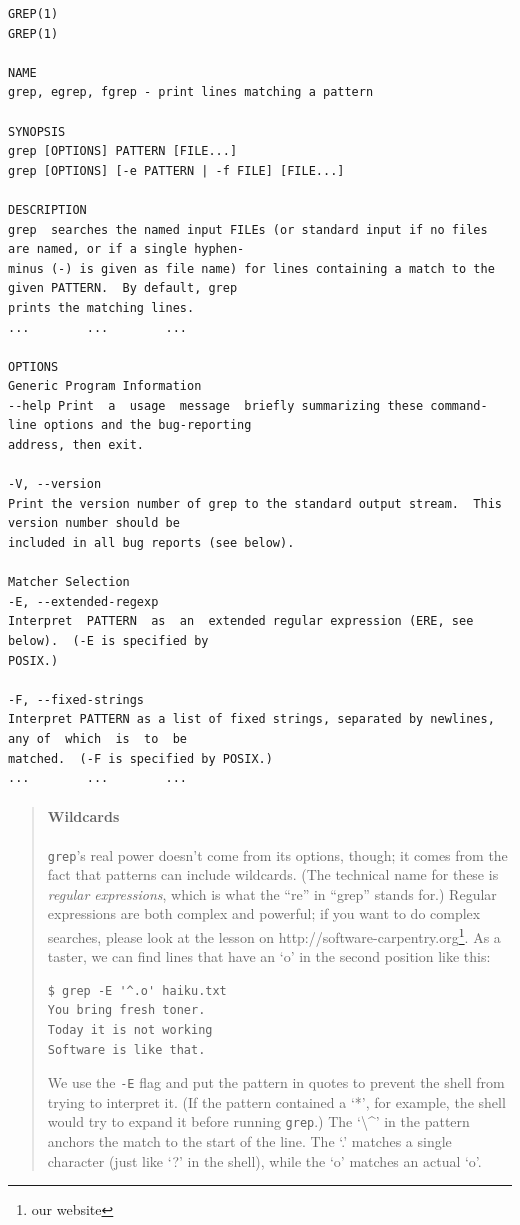 \documentclass[]{book}
\newcommand{\urlfoot}[2]{{#1}\footnote{#2}}
\newcommand{\gdef}[2]{\emph{#2}}
\begin{document}
\begin{verbatim}
GREP(1)                                                                                              GREP(1)

NAME
grep, egrep, fgrep - print lines matching a pattern

SYNOPSIS
grep [OPTIONS] PATTERN [FILE...]
grep [OPTIONS] [-e PATTERN | -f FILE] [FILE...]

DESCRIPTION
grep  searches the named input FILEs (or standard input if no files are named, or if a single hyphen-
minus (-) is given as file name) for lines containing a match to the given PATTERN.  By default, grep
prints the matching lines.
...        ...        ...

OPTIONS
Generic Program Information
--help Print  a  usage  message  briefly summarizing these command-line options and the bug-reporting
address, then exit.

-V, --version
Print the version number of grep to the standard output stream.  This version number should be
included in all bug reports (see below).

Matcher Selection
-E, --extended-regexp
Interpret  PATTERN  as  an  extended regular expression (ERE, see below).  (-E is specified by
POSIX.)

-F, --fixed-strings
Interpret PATTERN as a list of fixed strings, separated by newlines, any of  which  is  to  be
matched.  (-F is specified by POSIX.)
...        ...        ...
\end{verbatim}

\begin{quote}
\mbox{}\paragraph{Wildcards}

\texttt{grep}'s real power doesn't come from its options, though; it
comes from the fact that patterns can include wildcards. (The technical
name for these is \gdef{g:regular-expression}{regular expressions},
which is what the ``re'' in ``grep'' stands for.) Regular expressions
are both complex and powerful; if you want to do complex searches,
please look at the lesson on \urlfoot{http://software-carpentry.org}{our
website}. As a taster, we can find lines that have an `o' in the second
position like this:

\begin{verbatim}
$ grep -E '^.o' haiku.txt
You bring fresh toner.
Today it is not working
Software is like that.
\end{verbatim}

We use the \texttt{-E} flag and put the pattern in quotes to prevent the
shell from trying to interpret it. (If the pattern contained a `*', for
example, the shell would try to expand it before running \texttt{grep}.)
The `\textbackslash{}\^{}' in the pattern anchors the match to the start
of the line. The `.' matches a single character (just like `?' in the
shell), while the `o' matches an actual `o'.
\end{quote}
\end{document}
